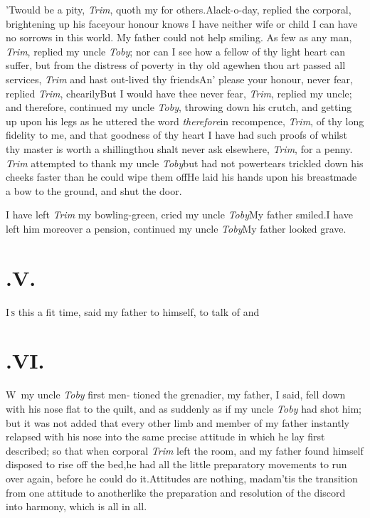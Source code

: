 \documentclass{article}
\begin{document}
\tsk ’Twould be a pity, \textit{Trim}, quoth my
for others.\tsh Alack-o-day, replied the 
corporal, brightening up his face\tsk your
honour knows I have neither wife or child\break
\tsh I can have no sorrows in this world.\break
\tsk My father could not help smiling.\tsk\pb
As few as any man, \textit{Trim}, replied my uncle
\textit{Toby}; nor can I see how a fellow of thy light heart
can suffer, but from the distress of poverty in thy old
age\tsk when thou art passed all services, \textit{Trim}\tsk
and hast out-lived thy friends\tsk An’ please your honour,
never fear, replied \textit{Trim}, chearily\tsk But I would
have thee never fear, \textit{Trim}, replied my uncle;
and therefore, continued my uncle
\textit{Toby}, throwing down his crutch, and getting up upon
his legs as he uttered the word \textit{therefore}\tsk in
recompence, \textit{Trim}, of thy long fidelity to me, and
that goodness of thy heart I have had such proofs of\tsk
whilst thy master is worth a shilling\tsk thou shalt never
ask elsewhere, \textit{Trim}, for a penny. \textit{Trim}
attempted to thank my uncle \textit{Toby}\tsk but had not
power\tsk tears trickled down his cheeks faster than he
could wipe them off\tsk He laid his hands upon\pb
his breast\tsh made a bow to the ground, and shut the door.

\tsk I have left \textit{Trim} my bowling-green, cried my
uncle \textit{Toby}\tsk My father smiled.\break\tsk I
have left him moreover a pension, continued my uncle
\textit{Toby}\tsk My father looked grave.

\section{.\enspace V.}

\lettrine{I}{\,s} this a fit time, said my father to\break
himself, to talk of  and\break
{}

\section{.\enspace VI.}

\lettrine{W}{\,} my uncle \textit{Toby} first men-\break
tioned the grenadier, my father,\break
I said, fell down with his nose flat to the quilt, and as
suddenly as if my uncle\pb
\textit{Toby} had shot him; but it was not added that every
other limb and member of my father instantly relapsed with
his nose into the same precise attitude in which he lay
first described; so that when corporal \textit{Trim} left
the room, and my father found himself disposed to rise off
the bed,\tsk he had all the little preparatory movements to
run over again, before he could do it.\tsk  Attitudes are
nothing, madam\tsk ’tis the transition from one attitude to
another\tsk like the preparation and resolution of the
discord into harmony, which is all in all.
\end{document}
